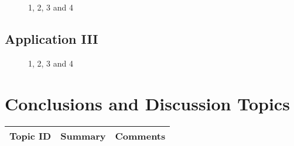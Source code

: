 \begin{figure}[H]
	\centering
	\begin{minipage}[b]{0.5\linewidth}
	\end{minipage}\hfill
	\begin{minipage}[b]{0.5\linewidth}
	\end{minipage}\hfill	
	\begin{minipage}[b]{0.5\linewidth}
	\end{minipage}\hfill
	\begin{minipage}[b]{0.5\linewidth}
	\end{minipage}\hfill
	\caption{1, 2, 3 and 4}
	\label{fig:Figure1}
\end{figure} 



\subsection{Application III}


\begin{figure}[H]
	\centering
	\begin{minipage}[b]{0.5\linewidth}
	\end{minipage}\hfill
	\begin{minipage}[b]{0.5\linewidth}
	\end{minipage}\hfill	
	\begin{minipage}[b]{0.5\linewidth}
	\end{minipage}\hfill
	\begin{minipage}[b]{0.5\linewidth}
	\end{minipage}\hfill
	\caption{1, 2, 3 and 4}
	\label{fig:Figure1}
\end{figure} 


\section{Conclusions and Discussion Topics}

\begin{table}[H]\centering
	\begin{tabular}{p{1cm}p{4cm}p{3cm}}
		Topic ID & Summary & Comments\\
		\hline
		\hline
	\end{tabular}
\end{table}


